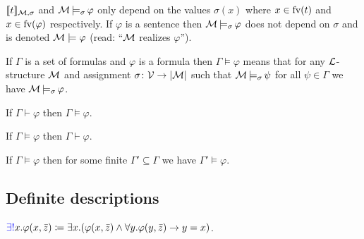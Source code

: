 \begin{rem}
    $\llbracket t \rrbracket_{\mathcal{M}, \sigma}$ and $\mathcal{M} \operatorname{\models_{\sigma}} \varphi$ only depend on the values $\sigma(x)$ where $x \in \text{fv}(t)$ and $x \in \text{fv}(\varphi)$ respectively.
    If $\varphi$ is a sentence then $\mathcal{M} \operatorname{\models_{\sigma}} \varphi$ does not depend on $\sigma$ and is denoted \alert{$\mathcal{M} \models \varphi$} (read: ``$\mathcal{M}$ realizes $\varphi$'').
\end{rem}

\begin{boxdef}
\begin{defi}
    If $\Gamma$ is a set of formulas and $\varphi$ is a formula then \alert{$\Gamma \models \varphi$} means that for any $\mathcal{L}$-structure $\mathcal{M}$ and assignment $\sigma \colon \mathcal{V} \to \lvert \mathcal{M} \rvert$ such that $\mathcal{M} \operatorname{\models_{\sigma}} \psi$ for all $\psi \in \Gamma$ we have $\mathcal{M} \operatorname{\models_{\sigma}} \varphi$.
\end{defi}
\end{boxdef}

\begin{boxthe}
\begin{thm}
    If $\Gamma \vdash \varphi$ then $\Gamma \models \varphi$.
\end{thm}
\end{boxthe}

\begin{boxthe}
\begin{thm}
    If $\Gamma \models \varphi$ then $\Gamma \vdash \varphi$.
\end{thm}
\end{boxthe}

\begin{boxthe}
\begin{thm}
    If $\Gamma \models \varphi$ then for some finite $\Gamma' \subseteq \Gamma$ we have $\Gamma' \models \varphi$.
\end{thm}
\end{boxthe}

\subsection{Definite descriptions}

\begin{boxdef}
\begin{defi}
    $\alert{\exists!}x. \varphi(x, \vect{z}) \coloneq \exists x. (\varphi(x, \vect{z}) \wedge \forall y. \varphi(y, \vect{z}) \to y = x)$.
\end{defi}
\end{boxdef}

